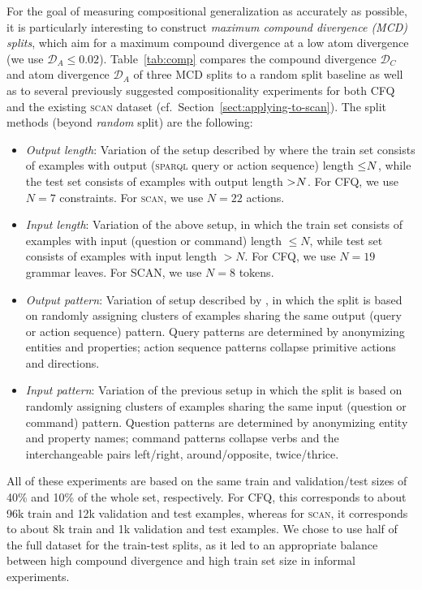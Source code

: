 \documentclass[letterpaper]{article}
\newcommand{\SPARQL}{\textsc{sparql}}
\newcommand{\SCAN}{\textsc{scan}}
\begin{document}
For the goal of measuring compositional generalization as accurately as possible, it is particularly interesting to construct \textit{maximum compound divergence (MCD) splits}, which aim for a maximum compound divergence at a low atom divergence (we use $\mathcal{D}_A \leq 0.02$).
Table~\ref{tab:comp} compares the compound divergence $\mathcal{D}_C$ and atom divergence $\mathcal{D}_A$ of three MCD splits to a random split baseline as well as to several previously suggested compositionality experiments for both CFQ and the existing \SCAN{} dataset (cf.\ Section~\ref{sect:applying-to-scan}). 
The split methods (beyond \textit{random} split) are the following:
\begin{itemize}
    \item \emph{Output length}: Variation of the setup described by \citet{Lake2018GeneralizationWS} where the train set consists of examples with output (\SPARQL{} query or action sequence) length $\leq \hspace{-0.25em} N$, while the test set consists of examples with output length $> \hspace{-0.25em} N$. 
    For CFQ, we use $N = 7$ constraints. For \SCAN{}, we use $N = 22$ actions.
    \item \emph{Input length}: Variation of the above setup, in which the train set consists of examples with input (question or command) length $\leq N$, while test set consists of examples with input length $> N$. 
    For CFQ, we use $N=19$ grammar leaves. For SCAN, we use $N=8$ tokens.
    \item \emph{Output pattern}: Variation of setup described by \citet{ACL2018sql}, in which the split is based on randomly assigning clusters of examples sharing the same output (query or action sequence) pattern. Query patterns are determined by anonymizing entities and properties; action sequence patterns collapse primitive actions and directions.
    \item \emph{Input pattern}: Variation of the previous setup in which the split is based on randomly assigning clusters of examples sharing the same input (question or command) pattern. Question patterns are determined by anonymizing entity and property names; command patterns collapse verbs and the interchangeable pairs left/right, around/opposite, twice/thrice.
\end{itemize}

All of these experiments are based on the same train and validation/test sizes of 40\% and 10\% of the whole set, respectively. For CFQ, this corresponds to about 96k train and 12k validation and test examples, whereas for \SCAN{}, it corresponds to about 8k train and 1k validation and test examples. 
We chose to use half of the full dataset for the train-test splits, as it led to an appropriate balance between high compound divergence and high train set size in informal experiments.
\end{document}
